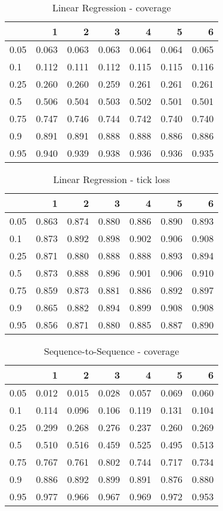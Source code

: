 \documentclass{article}
\begin{document}
\begin{table}[h!]
\centering
\caption{Linear Regression - coverage}
\label{tab: Linear Regression cov}
\begin{tabular}{lrrrrrr}
\toprule
 & 1 & 2 & 3 & 4 & 5 & 6 \\
\midrule
0.05 & 0.063 & 0.063 & 0.063 & 0.064 & 0.064 & 0.065 \\
0.1 & 0.112 & 0.111 & 0.112 & 0.115 & 0.115 & 0.116 \\
0.25 & 0.260 & 0.260 & 0.259 & 0.261 & 0.261 & 0.261 \\
0.5 & 0.506 & 0.504 & 0.503 & 0.502 & 0.501 & 0.501 \\
0.75 & 0.747 & 0.746 & 0.744 & 0.742 & 0.740 & 0.740 \\
0.9 & 0.891 & 0.891 & 0.888 & 0.888 & 0.886 & 0.886 \\
0.95 & 0.940 & 0.939 & 0.938 & 0.936 & 0.936 & 0.935 \\
\bottomrule
\end{tabular}
\end{table}

\begin{table}[h!]
\centering
\caption{Linear Regression - tick loss}
\label{tab: Linear Regression tic}
\begin{tabular}{lrrrrrr}
\toprule
 & 1 & 2 & 3 & 4 & 5 & 6 \\
\midrule
0.05 & 0.863 & 0.874 & 0.880 & 0.886 & 0.890 & 0.893 \\
0.1 & 0.873 & 0.892 & 0.898 & 0.902 & 0.906 & 0.908 \\
0.25 & 0.871 & 0.880 & 0.888 & 0.888 & 0.893 & 0.894 \\
0.5 & 0.873 & 0.888 & 0.896 & 0.901 & 0.906 & 0.910 \\
0.75 & 0.859 & 0.873 & 0.881 & 0.886 & 0.892 & 0.897 \\
0.9 & 0.865 & 0.882 & 0.894 & 0.899 & 0.908 & 0.908 \\
0.95 & 0.856 & 0.871 & 0.880 & 0.885 & 0.887 & 0.890 \\
\bottomrule
\end{tabular}
\end{table}

\begin{table}[h!]
\centering
\caption{Sequence-to-Sequence - coverage}
\label{tab: Sequence-to-Sequence cov}
\begin{tabular}{lrrrrrr}
\toprule
 & 1 & 2 & 3 & 4 & 5 & 6 \\
\midrule
0.05 & 0.012 & 0.015 & 0.028 & 0.057 & 0.069 & 0.060 \\
0.1 & 0.114 & 0.096 & 0.106 & 0.119 & 0.131 & 0.104 \\
0.25 & 0.299 & 0.268 & 0.276 & 0.237 & 0.260 & 0.269 \\
0.5 & 0.510 & 0.516 & 0.459 & 0.525 & 0.495 & 0.513 \\
0.75 & 0.767 & 0.761 & 0.802 & 0.744 & 0.717 & 0.734 \\
0.9 & 0.886 & 0.892 & 0.899 & 0.891 & 0.876 & 0.880 \\
0.95 & 0.977 & 0.966 & 0.967 & 0.969 & 0.972 & 0.953 \\
\bottomrule
\end{tabular}
\end{table}
\end{document}
